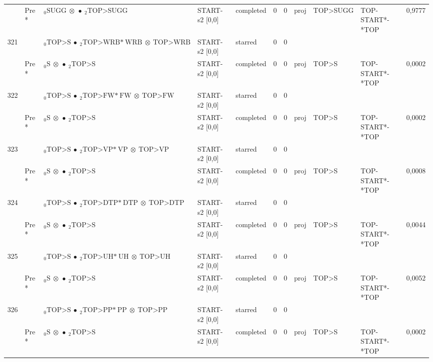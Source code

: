 \documentclass[10pt]{article}
\begin{document}
\begin{longtable}[htbp]{lllllllllll}
 & Pre *& $ {}_0 \textrm{SUGG} \  \otimes \  \bullet \ {}_{2} \textrm{TOP>SUGG} $ & START-s2 [0,0] & completed & 0 & 0 & proj & TOP>SUGG & TOP-START*-*TOP & 0,9777 \\ 
321 & & $ {}_0 \textrm{TOP>S} \  \bullet \ {}_{2} \textrm{TOP>WRB*} \ \textrm{WRB} \  \otimes \ \textrm{TOP>WRB} $ & START-s2 [0,0] & starred & 0 & 0 & & & & \\ 
 & Pre *& $ {}_0 \textrm{S} \  \otimes \  \bullet \ {}_{2} \textrm{TOP>S} $ & START-s2 [0,0] & completed & 0 & 0 & proj & TOP>S & TOP-START*-*TOP & 0,0002 \\ 
322 & & $ {}_0 \textrm{TOP>S} \  \bullet \ {}_{2} \textrm{TOP>FW*} \ \textrm{FW} \  \otimes \ \textrm{TOP>FW} $ & START-s2 [0,0] & starred & 0 & 0 & & & & \\ 
 & Pre *& $ {}_0 \textrm{S} \  \otimes \  \bullet \ {}_{2} \textrm{TOP>S} $ & START-s2 [0,0] & completed & 0 & 0 & proj & TOP>S & TOP-START*-*TOP & 0,0002 \\ 
323 & & $ {}_0 \textrm{TOP>S} \  \bullet \ {}_{2} \textrm{TOP>VP*} \ \textrm{VP} \  \otimes \ \textrm{TOP>VP} $ & START-s2 [0,0] & starred & 0 & 0 & & & & \\ 
 & Pre *& $ {}_0 \textrm{S} \  \otimes \  \bullet \ {}_{2} \textrm{TOP>S} $ & START-s2 [0,0] & completed & 0 & 0 & proj & TOP>S & TOP-START*-*TOP & 0,0008 \\ 
324 & & $ {}_0 \textrm{TOP>S} \  \bullet \ {}_{2} \textrm{TOP>DTP*} \ \textrm{DTP} \  \otimes \ \textrm{TOP>DTP} $ & START-s2 [0,0] & starred & 0 & 0 & & & & \\ 
 & Pre *& $ {}_0 \textrm{S} \  \otimes \  \bullet \ {}_{2} \textrm{TOP>S} $ & START-s2 [0,0] & completed & 0 & 0 & proj & TOP>S & TOP-START*-*TOP & 0,0044 \\ 
325 & & $ {}_0 \textrm{TOP>S} \  \bullet \ {}_{2} \textrm{TOP>UH*} \ \textrm{UH} \  \otimes \ \textrm{TOP>UH} $ & START-s2 [0,0] & starred & 0 & 0 & & & & \\ 
 & Pre *& $ {}_0 \textrm{S} \  \otimes \  \bullet \ {}_{2} \textrm{TOP>S} $ & START-s2 [0,0] & completed & 0 & 0 & proj & TOP>S & TOP-START*-*TOP & 0,0052 \\ 
326 & & $ {}_0 \textrm{TOP>S} \  \bullet \ {}_{2} \textrm{TOP>PP*} \ \textrm{PP} \  \otimes \ \textrm{TOP>PP} $ & START-s2 [0,0] & starred & 0 & 0 & & & & \\ 
 & Pre *& $ {}_0 \textrm{S} \  \otimes \  \bullet \ {}_{2} \textrm{TOP>S} $ & START-s2 [0,0] & completed & 0 & 0 & proj & TOP>S & TOP-START*-*TOP & 0,0002 \\ 

\end{longtable}
\end{document}
